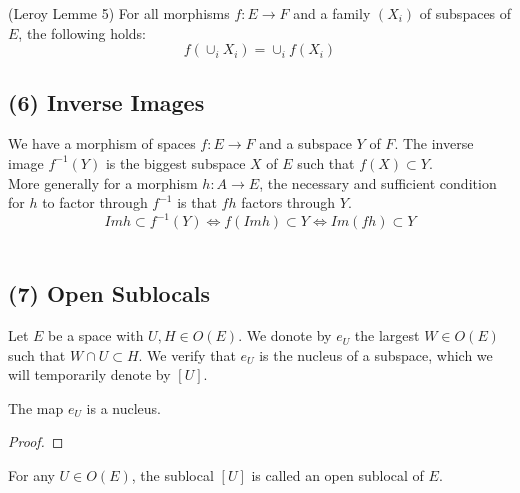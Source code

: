 \begin{lemma}
(Leroy Lemme 5)
    \label{lem:direct_images_families}
    For all morphisms $f: E \rightarrow F$ and a family $(X_i)$ of subspaces of $E$, the following holds:
    \[f(\cup_i X_i) = \cup_i f(X_i)\]
\end{lemma}

\subsection{(6) Inverse Images}
\begin{definition}
    \label{def:inverse_images}
    We have a morphism of spaces $f : E \rightarrow F$ and a subspace $Y$ of $F$. The inverse image $f^{-1}(Y)$ is the biggest subspace $X$ of $E$ such that $f(X) \subset Y$. \\
    More generally for a morphism $h : A \rightarrow E$, the necessary and sufficient condition for $h$ to factor through $f^{-1}$ is that $fh$ factors through $Y$.
    \[Im h \subset f^{-1}(Y)\iff f(Im h) \subset Y \iff Im(fh) \subset Y \] \
\end{definition}

\subsection{(7) Open Sublocals}

\begin{definition}[$e_U$]
    \label{def:e_U}
    \lean{e_U}
    \leanok
    Let $E$ be a space with $U, H \in O(E)$. We donote by $e_U$ the largest $W \in O(E)$ such that $W \cap U \subset H$. We verify that $e_U$ is the nucleus of a subspace, which we will temporarily denote by $[U]$.
\end{definition}

\begin{lemma}[$e_U$ is a nucleus]
    \label{lem:e_U_nucleus}
    \leanok
    The map $e_U$ is a nucleus.
\end{lemma}
\begin{proof}
    \leanok
\end{proof}


\begin{definition}
    \label{def:open_sublocal}
    \leanok
    For any $U \in O(E)$, the sublocal $[U]$ is called an open sublocal of $E$.
\end{definition}


